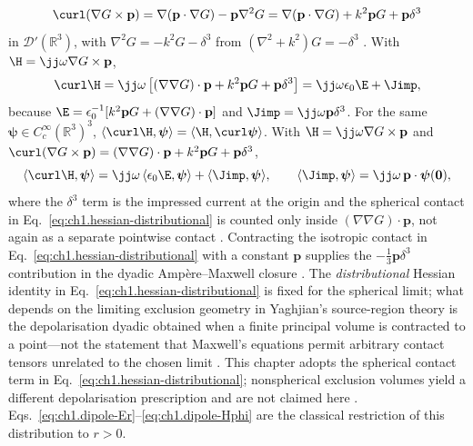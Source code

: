 \[
\curl(\nabla G\times\mathbf{p})
=\nabla(\mathbf{p}\cdot\nabla G)-\mathbf{p}\nabla^2 G
=\nabla(\mathbf{p}\cdot\nabla G)+k^2\mathbf{p}G+\mathbf{p}\delta^{3}
\]
in $\mathcal{D}'(\mathbb{R}^{3})$, with $\nabla^2G=-k^2G-\delta^{3}$ from $(\nabla^2+k^2)G=-\delta^{3}$ \cite{yaghjian1980dyadic,yaghjian1982}. With $\H=\jj\omega\nabla G\times\mathbf{p}$,
\begin{equation}
\label{eq:ch1.dipole-ampere-distributional}
\curl\H
=\jj\omega\left[
(\nabla\nabla G)\cdot\mathbf{p}
+k^{2}\mathbf{p}G
+\mathbf{p}\delta^{3}
\right]
=\jj\omega\epsilon_0\E+\Jimp,
\end{equation}
because $\E=\epsilon_0^{-1}[k^{2}\mathbf{p}G+(\nabla\nabla G)\cdot\mathbf{p}]$ and $\Jimp=\jj\omega\mathbf{p}\delta^{3}$. For the same $\boldsymbol\psi\in C_c^\infty(\mathbb{R}^{3})^{3}$, $\langle\curl\H,\boldsymbol\psi\rangle=\langle\H,\curl\boldsymbol\psi\rangle$. With $\H=\jj\omega\nabla G\times\mathbf{p}$ and $\curl(\nabla G\times\mathbf{p})=(\nabla\nabla G)\cdot\mathbf{p}+k^{2}\mathbf{p}G+\mathbf{p}\delta^{3}$,
\[
\langle\curl\H,\boldsymbol\psi\rangle
=\jj\omega\,\langle\epsilon_0\E,\boldsymbol\psi\rangle
+\langle\Jimp,\boldsymbol\psi\rangle,
\qquad
\langle\Jimp,\boldsymbol\psi\rangle=\jj\omega\,\mathbf{p}\cdot\boldsymbol\psi(\mathbf{0}),
\]
where the $\delta^{3}$ term is the impressed current at the origin and the spherical contact in Eq.~\eqref{eq:ch1.hessian-distributional} is counted only inside $(\nabla\nabla G)\cdot\mathbf{p}$, not again as a separate pointwise contact \cite{yaghjian1980dyadic,yaghjian1982,jackson1999}. Contracting the isotropic contact in Eq.~\eqref{eq:ch1.hessian-distributional} with a constant $\mathbf{p}$ supplies the $-\tfrac13\mathbf{p}\delta^{3}$ contribution in the dyadic Amp\`ere--Maxwell closure \cite{yaghjian1980dyadic,yaghjian1982}. The \emph{distributional} Hessian identity in Eq.~\eqref{eq:ch1.hessian-distributional} is fixed for the spherical limit; what depends on the limiting exclusion geometry in Yaghjian's source-region theory is the depolarisation dyadic obtained when a finite principal volume is contracted to a point---not the statement that Maxwell's equations permit arbitrary contact tensors unrelated to the chosen limit \cite{yaghjian1980dyadic,yaghjian1982}. This chapter adopts the spherical contact term in Eq.~\eqref{eq:ch1.hessian-distributional}; nonspherical exclusion volumes yield a different depolarisation prescription and are not claimed here \cite{yaghjian1980dyadic,yaghjian1982}. Eqs.~\eqref{eq:ch1.dipole-Er}--\eqref{eq:ch1.dipole-Hphi} are the classical restriction of this distribution to $r>0$.
